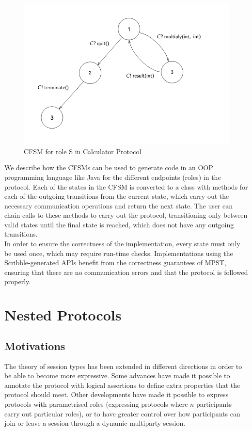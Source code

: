 \documentclass[12pt,twoside]{report}
\begin{document}
\begin{figure}[h!]
    \centering
    \includegraphics[scale=0.53]{scribble_fsm.png}
    \caption{CFSM for role S in Calculator Protocol}
    \label{scribble_fsm}
\end{figure}{}
We describe how the CFSMs can be used to generate code in an OOP programming language like Java for the different endpoints (roles) in the protocol. Each of the states in the CFSM is converted to a class with methods for each of the outgoing transitions from the current state, which carry out the necessary communication operations and return the next state. The user can chain calls to these methods to carry out the protocol, transitioning only between valid states until the final state is reached, which does not have any outgoing transitions. \\

In order to ensure the correctness of the implementation, every state must only be used once, which may require run-time checks. Implementations using the Scribble-generated APIs benefit from the correctness guarantees of MPST, ensuring that there are no communication errors and that the protocol is followed properly.\\

\section{Nested Protocols}
\subsection{Motivations}
The theory of session types has been extended in different directions in order to be able to become more expressive. Some advances have made it possible to annotate the protocol with logical assertions to define extra properties that the protocol should meet\cite{logicaassertions}. Other developments have made it possible to express protocols with parametrised roles\cite{parametrictypes} (expressing protocols where $n$ participants carry out particular roles), or to have greater control over how participants can join or leave a session through a dynamic multiparty session\cite{multirolesessiontypes}. \\
\end{document}
